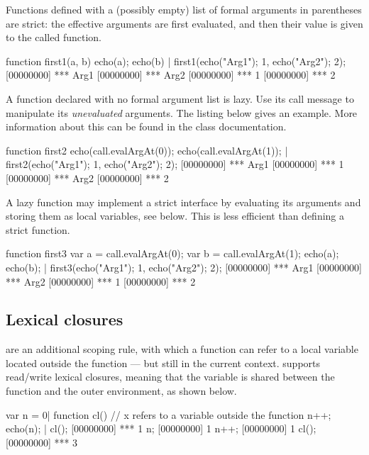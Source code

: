 Functions defined with a (possibly empty) list of formal arguments in
parentheses are strict: the effective arguments are first evaluated,
and then their value is given to the called function.

\begin{urbiscript}[firstnumber=last]
function first1(a, b) {
  echo(a); echo(b)
}|
first1({echo("Arg1"); 1},
       {echo("Arg2"); 2});
[00000000] *** Arg1
[00000000] *** Arg2
[00000000] *** 1
[00000000] *** 2
\end{urbiscript}

A function declared with no formal argument list is lazy.  Use its
call message to manipulate its \emph{unevaluated} arguments.
The listing below gives an example.  More information about
this can be found in the  class documentation.

\begin{urbiscript}[firstnumber=last]
function first2
{
  echo(call.evalArgAt(0));
  echo(call.evalArgAt(1));
}|
first2({echo("Arg1"); 1},
       {echo("Arg2"); 2});
[00000000] *** Arg1
[00000000] *** 1
[00000000] *** Arg2
[00000000] *** 2
\end{urbiscript}

A lazy function may implement a strict interface by evaluating its
arguments and storing them as local variables, see below.  This is
less efficient than defining a strict function.

\begin{urbiscript}[firstnumber=last]
function first3
{
  var a = call.evalArgAt(0);
  var b = call.evalArgAt(1);
  echo(a); echo(b);
}|
first3({echo("Arg1"); 1},
       {echo("Arg2"); 2});
[00000000] *** Arg1
[00000000] *** Arg2
[00000000] *** 1
[00000000] *** 2
\end{urbiscript}

\subsection{Lexical closures}
\label{sec:us-fun-closures}

 are an additional scoping rule, with which a function
can refer to a local variable located outside the function --- but still
in the current context. \us supports read/write lexical closures,
meaning that the variable is shared between the function and the outer
environment, as shown below.

\begin{urbiscript}[firstnumber=last]
var n = 0|
function cl()
{
  // x refers to a variable outside the function
  n++;
  echo(n);
}|
cl();
[00000000] *** 1
n;
[00000000] 1
n++;
[00000000] 1
cl();
[00000000] *** 3
\end{urbiscript}

